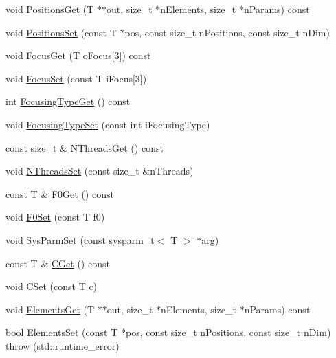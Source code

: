 \begin{DoxyCompactItemize}
\item 
void \hyperlink{classfnm_1_1Aperture_ad5917a3f2f62df8cf44a9a8db7fd6fde}{Positions\+Get} (T $\ast$$\ast$out, size\+\_\+t $\ast$n\+Elements, size\+\_\+t $\ast$n\+Params) const 
\item 
void \hyperlink{classfnm_1_1Aperture_ab10c2efc99c80b25caa3abab50b14856}{Positions\+Set} (const T $\ast$pos, const size\+\_\+t n\+Positions, const size\+\_\+t n\+Dim)
\item 
void \hyperlink{classfnm_1_1Aperture_aed74195d0a3d7bb7bf42a9d97691ebbf}{Focus\+Get} (T o\+Focus\mbox{[}3\mbox{]}) const 
\item 
void \hyperlink{classfnm_1_1Aperture_aa2a0b49036000182665d4218489bf2e4}{Focus\+Set} (const T i\+Focus\mbox{[}3\mbox{]})
\item 
int \hyperlink{classfnm_1_1Aperture_a77d8cd829340ff37dfdd502b1b47f5fe}{Focusing\+Type\+Get} () const 
\item 
void \hyperlink{classfnm_1_1Aperture_a7ec287084c79fb733e2ff5a471387f5f}{Focusing\+Type\+Set} (const int i\+Focusing\+Type)
\item 
const size\+\_\+t \& \hyperlink{classfnm_1_1Aperture_a6697d507490040a87dbd4a3d67a13fc7}{N\+Threads\+Get} () const 
\item 
void \hyperlink{classfnm_1_1Aperture_a4cfa8bc49387e8ab7d2ac23ed1b1ccf6}{N\+Threads\+Set} (const size\+\_\+t \&n\+Threads)
\item 
const T \& \hyperlink{classfnm_1_1Aperture_afd19e2ba296df82e56e58ebd151c7a71}{F0\+Get} () const 
\item 
void \hyperlink{classfnm_1_1Aperture_a67f51a08d98cc368cc4c4a6414edb3fa}{F0\+Set} (const T f0)
\item 
void \hyperlink{classfnm_1_1Aperture_adffaa1f7cab073f40c532fc58cf6e55c}{Sys\+Parm\+Set} (const \hyperlink{structfnm_1_1sysparm__t}{sysparm\+\_\+t}$<$ T $>$ $\ast$arg)
\item 
const T \& \hyperlink{classfnm_1_1Aperture_a315ccdf731ff56729bfa8f5a1305a345}{C\+Get} () const 
\item 
void \hyperlink{classfnm_1_1Aperture_a49d9268feca025de3dc648abf6a8b3e1}{C\+Set} (const T c)
\item 
void \hyperlink{classfnm_1_1Aperture_a8bab384e28c3bb00f9e0a521c30ef64c}{Elements\+Get} (T $\ast$$\ast$out, size\+\_\+t $\ast$n\+Elements, size\+\_\+t $\ast$n\+Params) const 
\item 
bool \hyperlink{classfnm_1_1Aperture_a907987dd1686d882fdd35fd677d9c56d}{Elements\+Set} (const T $\ast$pos, const size\+\_\+t n\+Positions, const size\+\_\+t n\+Dim)  throw (std\+::runtime\+\_\+error)

\end{DoxyCompactItemize}
